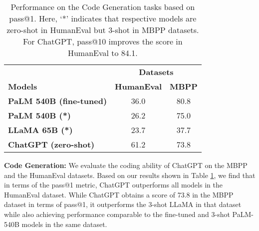 \documentclass[11pt]{article}
\begin{document}
\begin{table}
\centering
\setlength{\tabcolsep}{3pt}
\small 
{}
\vspace{-1em}
\caption{Performance on Mathematical Reasoning.}
\label{tab:math}
\end{table} 
\begin{table}
\centering
\small 
\setlength{\tabcolsep}{3pt}
\begin{tabular}{lcc}
\toprule
 & \multicolumn{2}{c}{\textbf{Datasets}}  \\ 
 \cmidrule(lr){2-3} 
\textbf{Models}& \multicolumn{1}{c}{\textbf{HumanEval}} & \textbf{MBPP} \\
\midrule
\textbf{PaLM 540B (fine-tuned)} & 36.0  & 80.8   \\ 
\textbf{PaLM 540B (*)} & 26.2 & 75.0  \\ 
\textbf{LLaMA 65B (*)} & 23.7 & 37.7  \\ 
\textbf{ChatGPT (zero-shot)}  & {61.2} & 73.8  \\ 

\bottomrule
\end{tabular}
\caption{\small{Performance on the Code Generation tasks based on pass@1. Here, `*' indicates that respective models are zero-shot in HumanEval but 3-shot in MBPP datasets. For ChatGPT, pass@10 improves the score in HumanEval to 84.1.}} \label{tab:codeeval}
\end{table}   \textbf{Code Generation:} We evaluate the coding ability of ChatGPT on the MBPP \cite{austin2021program} and the HumanEval \cite{chen2021evaluatinghuman} datasets. Based on our results shown in Table \ref{tab:codeeval}, we find that in terms of the pass@1 metric, ChatGPT outperforms all models in the HumanEval dataset. While ChatGPT obtains a score of 73.8 in the MBPP dataset in terms of pass@1, it outperforms the 3-shot LLaMA in that dataset while also achieving performance comparable to the fine-tuned and 3-shot PaLM-540B models in the same dataset. 
\end{document}
